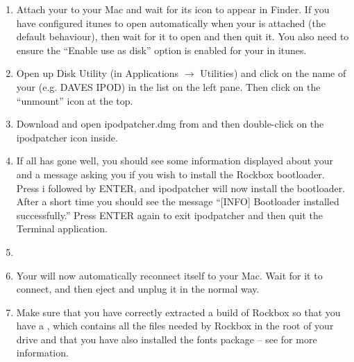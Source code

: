 \begin{enumerate}

\item Attach your \dap{} to your Mac and wait for its icon to appear in 
Finder. If you have configured itunes to open automatically when your
\dap{} is attached (the default behaviour), then wait for it to open and
then quit it. You also need to ensure the ``Enable use as disk'' option
is enabled for your \dap{} in itunes.

\item\label{subsec:macos_umount} Open up Disk Utility
(in Applications $\rightarrow$ Utilities) and click 
on the name of your \dap{} (e.g. DAVES IPOD) in the list on the left 
pane. Then click on the ``unmount'' icon at the top. 

\item Download and open ipodpatcher.dmg from 
and then double-click on the ipodpatcher icon inside. 

\item If all has gone well, you should see some 
information displayed about your \dap{} and a message asking you if you 
wish to install the Rockbox bootloader. Press i followed by ENTER, and 
ipodpatcher will now install the bootloader. After a short time you 
should see the message ``[INFO] Bootloader installed successfully.'' Press 
ENTER again to exit ipodpatcher and then quit the Terminal application.

\item {}

\item Your \dap{} will now automatically reconnect itself to your Mac. 
Wait for it to connect, and then eject and unplug it in the normal way. 

\item Make sure that you have correctly extracted a build of Rockbox so that
you have a , which contains all the files needed by Rockbox
in the root of your \daps{} drive and that you have also installed the fonts
package -- see  for more information.

\end{enumerate}


